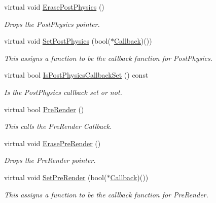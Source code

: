 \begin{DoxyCompactItemize}
virtual void \hyperlink{classphys_1_1CallBackManager_a2d03573a93606e9d3fcd7adad5c8c397}{ErasePostPhysics} ()
\begin{DoxyCompactList}\small\item\em Drops the PostPhysics pointer. \item\end{DoxyCompactList}\item 
virtual void \hyperlink{classphys_1_1CallBackManager_a17687cd04807dfc80a25847be830c2f2}{SetPostPhysics} (bool($\ast$\hyperlink{classphys_1_1ManagerBase_a753f5f0127131529767beab2502f480b}{Callback})())
\begin{DoxyCompactList}\small\item\em This assigns a function to be the callback function for PostPhysics. \item\end{DoxyCompactList}\item 
virtual bool \hyperlink{classphys_1_1CallBackManager_ad1e2131d792c6813caae4be4d5c4e5fb}{IsPostPhysicsCallbackSet} () const 
\begin{DoxyCompactList}\small\item\em Is the PostPhysics callback set or not. \item\end{DoxyCompactList}\item 
virtual bool \hyperlink{classphys_1_1CallBackManager_a244c88b8a06f68a4f4bcff6253bf6806}{PreRender} ()
\begin{DoxyCompactList}\small\item\em This calls the PreRender Callback. \item\end{DoxyCompactList}\item 
virtual void \hyperlink{classphys_1_1CallBackManager_adadf16f3f38398c9593646416ef18499}{ErasePreRender} ()
\begin{DoxyCompactList}\small\item\em Drops the PreRender pointer. \item\end{DoxyCompactList}\item 
virtual void \hyperlink{classphys_1_1CallBackManager_a1e060fd479413457a798ea3c6b2bcb4d}{SetPreRender} (bool($\ast$\hyperlink{classphys_1_1ManagerBase_a753f5f0127131529767beab2502f480b}{Callback})())
\begin{DoxyCompactList}\small\item\em This assigns a function to be the callback function for PreRender. \item\end{DoxyCompactList}\item 

\end{DoxyCompactItemize}

